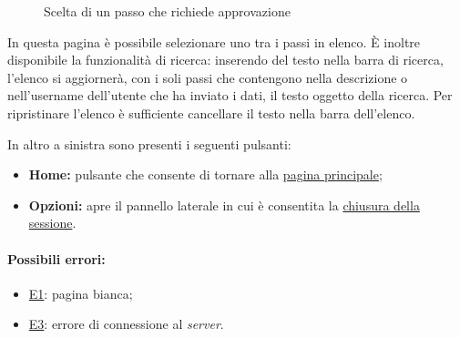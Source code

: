 \begin{figure}[H] \centering 
{} \caption{Scelta di un passo che richiede approvazione}
\label{fig:Fcheckstep}
\end{figure}

In questa pagina è possibile selezionare uno tra i passi in elenco. È inoltre disponibile la funzionalità di ricerca: inserendo del testo nella barra di ricerca, l'elenco si aggiornerà, con i soli passi che contengono nella descrizione o nell'username dell'utente che ha inviato i dati, il testo oggetto della ricerca.
Per ripristinare l'elenco è sufficiente cancellare il testo nella barra dell'elenco.

In altro a sinistra sono presenti i seguenti pulsanti:
\begin{itemize}
\item \textbf{Home:} pulsante che consente di tornare alla \hyperref[home]{pagina principale};
\item \textbf{Opzioni:} apre il pannello laterale in cui è consentita la \hyperref[logout]{chiusura della sessione}.
\end{itemize}

\paragraph*{Possibili errori:}
\begin{itemize}
\item \hyperref[e1]{E1}: pagina bianca;
\item \hyperref[e3]{E3}: errore di connessione al \textit{server}.
\end{itemize}

